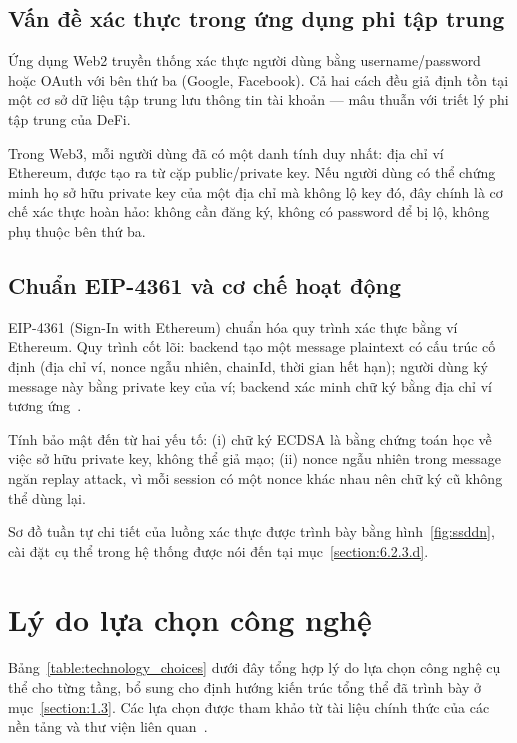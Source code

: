 \documentclass[../DoAn.tex]{subfiles}
\begin{document}
\subsection{Vấn đề xác thực trong ứng dụng phi tập trung}


Ứng dụng Web2 truyền thống xác thực người dùng bằng username/password hoặc OAuth với bên thứ ba (Google, Facebook). Cả hai cách đều giả định tồn tại một cơ sở dữ liệu tập trung lưu thông tin tài khoản --- mâu thuẫn với triết lý phi tập trung của DeFi.

Trong Web3, mỗi người dùng đã có một danh tính duy nhất: địa chỉ ví Ethereum, được tạo ra từ cặp public/private key. Nếu người dùng có thể chứng minh họ sở hữu private key của một địa chỉ mà không lộ key đó, đây chính là cơ chế xác thực hoàn hảo: không cần đăng ký, không có password để bị lộ, không phụ thuộc bên thứ ba.

\subsection{Chuẩn EIP-4361 và cơ chế hoạt động}


EIP-4361 (Sign-In with Ethereum) chuẩn hóa quy trình xác thực bằng ví Ethereum. Quy trình cốt lõi: backend tạo một message plaintext có cấu trúc cố định (địa chỉ ví, nonce ngẫu nhiên, chainId, thời gian hết hạn); người dùng ký message này bằng private key của ví; backend xác minh chữ ký bằng địa chỉ ví tương ứng~\cite{EIP4361}.

Tính bảo mật đến từ hai yếu tố: (i) chữ ký ECDSA là bằng chứng toán học về việc sở hữu private key, không thể giả mạo; (ii) nonce ngẫu nhiên trong message ngăn replay attack, vì mỗi session có một nonce khác nhau nên chữ ký cũ không thể dùng lại.

Sơ đồ tuần tự chi tiết của luồng xác thực được trình bày bằng hình~\ref{fig:ssddn}, cài đặt cụ thể trong hệ thống được nói đến tại mục~\ref{section:6.2.3.d}.

\section{Lý do lựa chọn công nghệ}


Bảng~\ref{table:technology_choices} dưới đây tổng hợp lý do lựa chọn công nghệ cụ thể cho từng tầng, bổ sung cho định hướng kiến trúc tổng thể đã trình bày ở mục~\ref{section:1.3}. Các lựa chọn được tham khảo từ tài liệu chính thức của các nền tảng và thư viện liên quan~\cite{HardhatDocs,EthersJsDocs,OpenZeppelinDocs,RabbitMQDocs}.
\end{document}
